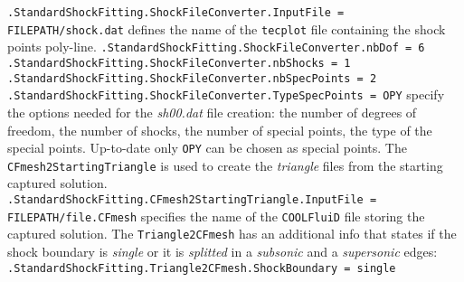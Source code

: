 \documentclass[11pt,a4paper,oneside]{article}
\begin{document}
\newline
\newline
\hspace*{1cm} \texttt{.StandardShockFitting.ShockFileConverter.InputFile = FILEPATH/shock.dat}
\newline
\newline
defines the name of the \texttt{tecplot} file containing the shock points poly-line.
\newline
\newline
\hspace*{1cm} \texttt{.StandardShockFitting.ShockFileConverter.nbDof = 6}
\newline
\hspace*{1cm} \texttt{.StandardShockFitting.ShockFileConverter.nbShocks = 1}
\newline
\hspace*{1cm} \texttt{.StandardShockFitting.ShockFileConverter.nbSpecPoints = 2}
\newline
\hspace*{1cm} \texttt{.StandardShockFitting.ShockFileConverter.TypeSpecPoints = OPY}
\newline
\newline
specify the options needed for the \textit{sh00.dat} file creation: the number of degrees of freedom, the number of shocks, the number of special points, the type of the special points.
\newline
Up-to-date only \texttt{OPY} can be chosen as special points.
\newline
\newline
The \texttt{CFmesh2StartingTriangle} is used to create the \textit{triangle} files from the starting captured solution.
\newline
\newline
\hspace*{1cm} \texttt{.StandardShockFitting.CFmesh2StartingTriangle.InputFile = FILEPATH/file.CFmesh}
\newline
\newline
specifies the name of the \texttt{COOLFluiD} file storing the captured solution.
\newline
\newline
The \texttt{Triangle2CFmesh} has an additional info that states if the shock boundary is \textit{single} or it is \textit{splitted} in a \textit{subsonic} and a \textit{supersonic} edges:
\newline
\newline
\hspace*{1cm} \texttt{.StandardShockFitting.Triangle2CFmesh.ShockBoundary = single}
\end{document}

